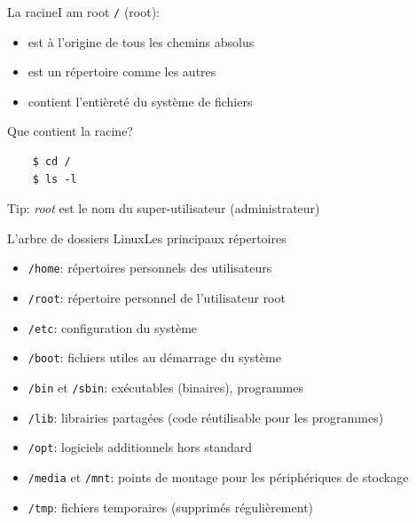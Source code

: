 \documentclass[
aspectratio=169 %
]{beamer}
\begin{document}
\begin{frame}[fragile]{La racine}{I am root}
    \texttt{/} (root):
    \begin{itemize}
        \item est à l'origine de tous les chemins absolus
        \item est un répertoire comme les autres
        \item contient l'entièreté du système de fichiers
    \end{itemize}

    \bigskip
    Que contient la racine?

    \begin{lstlisting}
    $ cd /
    $ ls -l
    \end{lstlisting}

    \alert{Tip:} \textit{root} est le nom du super-utilisateur (administrateur)
\end{frame}

\begin{frame}{L'arbre de dossiers Linux}{Les principaux répertoires}
    \begin{itemize}
        \item \texttt{/home}: répertoires personnels des utilisateurs
        \item \texttt{/root}: répertoire personnel de l'utilisateur root
        \item \texttt{/etc}: configuration du système
        \item \texttt{/boot}: fichiers utiles au démarrage du système
        \item \texttt{/bin} et \texttt{/sbin}: exécutables (binaires),
              programmes
        \item \texttt{/lib}: librairies partagées (code réutilisable pour les
              programmes)
        \item \texttt{/opt}: logiciels additionnels hors standard
        \item \texttt{/media} et \texttt{/mnt}: points de montage pour les
              périphériques de stockage
        \item \texttt{/tmp}: fichiers temporaires (supprimés régulièrement)
    \end{itemize}
\end{frame}
\end{document}
